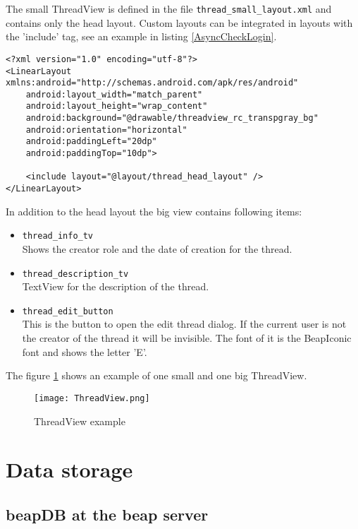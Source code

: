 \documentclass[12pt,a4paper,oneside]{report}
\newcommand{\beapDB}{beapDB}
\newcommand{\beapServer}{beap server}
\newcommand{\code}[1]{\lstinline{#1}}
\begin{document}
The small ThreadView is defined in the file \code{thread_small_layout.xml} and contains only the head layout. Custom layouts can be integrated in layouts with the 'include' tag, see an example in listing \ref{AsyncCheckLogin}.

\begin{lstlisting}[caption=Thread small layout, label=lst:ThreadSmallLayout]
<?xml version="1.0" encoding="utf-8"?>
<LinearLayout xmlns:android="http://schemas.android.com/apk/res/android"
    android:layout_width="match_parent"
    android:layout_height="wrap_content"
    android:background="@drawable/threadview_rc_transpgray_bg"
    android:orientation="horizontal"
    android:paddingLeft="20dp"
    android:paddingTop="10dp">

    <include layout="@layout/thread_head_layout" />
</LinearLayout>
\end{lstlisting}

In addition to the head layout the big view contains following items:
\begin{itemize}
\item \code{thread_info_tv}\\
Shows the creator role and the date of creation for the thread.

\item \code{thread_description_tv}\\
TextView for the description of the thread.

\item \code{thread_edit_button}\\
This is the button to open the edit thread dialog. If the current user is not the creator of the thread it will be invisible. The font of it is the BeapIconic font and shows the letter 'E'.

\end{itemize}
The figure \ref{fig:ThreadViewEx} shows an example of one small and one big ThreadView.
\begin{figure}[!ht]
	\centering
    \texttt{[image: ThreadView.png]}
	\caption{ThreadView example}
	\label{fig:ThreadViewEx}
\end{figure}

\section{Data storage}

\subsection{\beapDB{} at the \beapServer{}}
\end{document}
